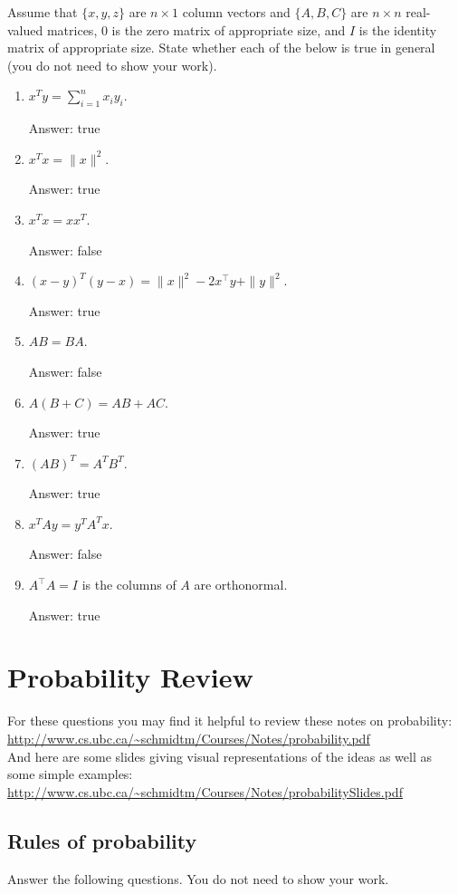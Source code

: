 \documentclass{article}
\def\ans#1{\par\gre{Answer: #1}}
\def\blu#1{{\color{blu}#1}}
\def\gre#1{{\color{gre}#1}}
\def\norm#1{\|#1\|}
\begin{document}
Assume that $\{x,y,z\}$ are $n \times 1$ column vectors and $\{A,B,C\}$ are $n \times n$ real-valued matrices, $0$ is the zero matrix of appropriate size, and $I$ is the identity matrix of appropriate size. \blu{State whether each of the below is true in general} (you do not need to show your work).

\begin{enumerate}
\item $x^Ty = \sum_{i=1}^n x_iy_i$. \ans{true}
\item $x^Tx = \norm{x}^2$. \ans{true}
\item $x^Tx = xx^T$.  \ans{false}
\item $(x-y)^T(y-x) = \norm{x}^2 - 2x^\top y + \norm{y}^2$. \ans{true}
\item $AB=BA$. \ans{false}
\item $A(B + C) = AB + AC$. \ans{true}
\item $(AB)^T = A^TB^T$. \ans{true}
\item $x^TAy = y^TA^Tx$. \ans{false}
\item $A^\top A = I$ is the columns of $A$ are orthonormal. \ans{true}
\end{enumerate}


\section{Probability Review}


For these questions you may find it helpful to review these notes on probability:\\
\url{http://www.cs.ubc.ca/~schmidtm/Courses/Notes/probability.pdf}\\
And here are some slides giving visual representations of the ideas as well as some simple examples:\\
\url{http://www.cs.ubc.ca/~schmidtm/Courses/Notes/probabilitySlides.pdf}

\subsection{Rules of probability}

\blu{Answer the following questions.} You do not need to show your work.
\end{document}
